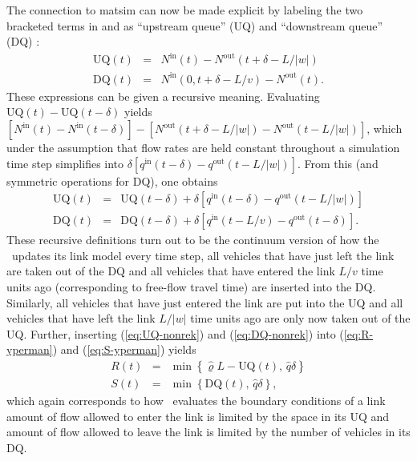 The connection to \gls{matsim} can now be made explicit by labeling the
two bracketed terms in  and 
as {}``upstream queue'' (UQ) and {}``downstream queue'' (DQ) \citep{osorio-2011a,osorio-2013b}:
\begin{eqnarray}
\text{UQ}(t) & = & N^{\text{in}}(t)-N^{\text{out}}(t+\delta-L/|w|)\label{eq:UQ-nonrek}\\
\text{DQ}(t) & = & N^{\text{in}}(0,t+\delta-L/v)-N^{\text{out}}(t)\label{eq:DQ-nonrek}.
\end{eqnarray}
These expressions can be given a recursive meaning. Evaluating
$\text{UQ}(t) - \text{UQ}(t - \delta)$ yields 
$[N^{\text{in}}(t) - N^{\text{in}}(t-\delta)] - [N^{\text{out}}(t+\delta-L/|w|) - N^{\text{out}}(t-L/|w|) ]$,
which under the assumption that flow rates are held constant throughout a simulation time step
simplifies into $\delta [ q^{\text{in}}(t-\delta) - q^{\text{out}}(t-L/|w|) ]$.
From this (and symmetric operations for DQ), one obtains
\begin{eqnarray}
\text{UQ}(t) & = & \text{UQ}(t-\delta)+\delta\left[q^{\text{in}}(t-\delta)-q^{\text{out}}(t-L/|w|)\right]\label{eq:UQ-rek}\\
\text{DQ}(t) & = & \text{DQ}(t-\delta)+\delta\left[q^{\text{in}}(t-L/v)-q^{\text{out}}(t-\delta)\right].\label{eq:DQ-rek}
\end{eqnarray}
These recursive definitions turn out to be the continuum version of
how the \DOUBLEQUEUESIM\ updates its link model
every time step, all vehicles that have just left the link are taken
out of the DQ and all vehicles that have entered the link $L/v$ time
units ago (corresponding to free-flow travel time) are inserted
into the DQ. Similarly, all vehicles that have just entered the link
are put into the UQ and all vehicles that have left the link $L/|w|$
time units ago are only now taken out of the UQ. Further, inserting
(\ref{eq:UQ-nonrek}) and (\ref{eq:DQ-nonrek}) into (\ref{eq:R-yperman})
and (\ref{eq:S-yperman}) yields
\begin{eqnarray}
R(t) & = & \min\left\{ \hat{\varrho}L-\text{UQ}(t),\,\hat{q}\delta\right\} \label{eq:R-matsim}\\
S(t) & = & \min\left\{ \text{DQ}(t),\,\hat{q}\delta\right\}, \label{eq:S-matsim}
\end{eqnarray}
which again corresponds to how \DOUBLEQUEUESIM\ 
evaluates the boundary conditions of a link amount of flow 
allowed to enter the link is limited by the space in its UQ and
 amount of flow allowed to leave the link is limited by the
number of vehicles in its DQ. 

